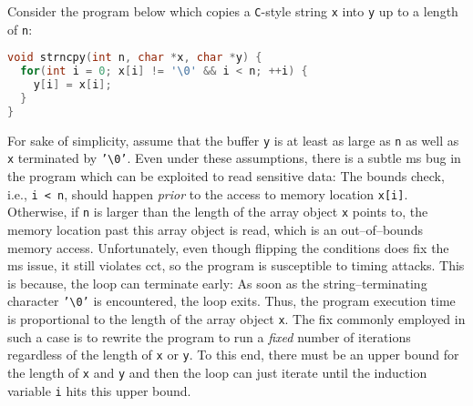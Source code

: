 \documentclass[utf8,acmsmall,review,screen,dvipsnames]{acmart}
\begin{document}
\begin{example}[strncpy]\label{ex:strncpy}
Consider the program below which copies a \texttt{C}-style string \texttt{x} into \texttt{y} up to a length of \texttt{n}:

\begin{lstlisting}[language=c,basicstyle=\small\ttfamily]
void strncpy(int n, char *x, char *y) {
  for(int i = 0; x[i] != '\0' && i < n; ++i) {
    y[i] = x[i];
  }
}
\end{lstlisting}

For sake of simplicity, assume that the buffer \texttt{y} is at least as large as \texttt{n} as well as \texttt{x} terminated by \texttt{'\textbackslash 0'}.
Even under these assumptions, there is a subtle \gls{ms} bug in the program which can be exploited to read sensitive data:
The bounds check, i.e., \texttt{i < n}, should happen {\it prior} to the access to memory location \texttt{x[i]}.
Otherwise, if \texttt{n} is larger than the length of the array object \texttt{x} points to, the memory location past this array object is read, which is an out--of--bounds memory access.
Unfortunately, even though flipping the conditions does fix the \gls{ms} issue, it still violates \gls{cct}, so the program is susceptible to timing attacks.
This is because, the loop can terminate early: As soon as the string--terminating character \texttt{'\textbackslash 0'} is encountered, the loop exits.
Thus, the program execution time is proportional to the length of the array object \texttt{x}.
The fix commonly employed in such a case is to rewrite the program to run a {\it fixed} number of iterations regardless of the length of \texttt{x} or \texttt{y}.
To this end, there must be an upper bound for the length of \texttt{x} and \texttt{y} and then the loop can just iterate until the induction variable \texttt{i} hits this upper bound.


\end{example}
\end{document}

